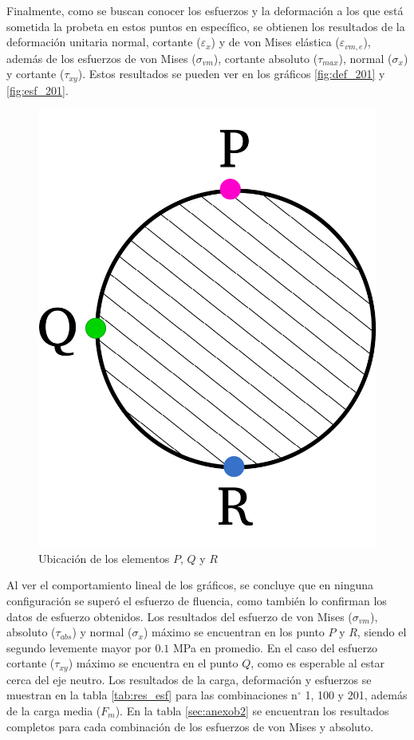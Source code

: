 \newpage

Finalmente, como se buscan conocer los esfuerzos y la deformación a los que está sometida la probeta en estos puntos en específico, se obtienen los resultados de la deformación unitaria normal, cortante ($\varepsilon_x$) y de von Mises elástica ($\varepsilon_{vm,e}$), además de los esfuerzos de von Mises ($\sigma_{vm}$), cortante absoluto ($\tau_{max}$), normal ($\sigma_x$) y cortante ($\tau_{xy}$). Estos resultados se pueden ver en los gráficos \ref{fig:def_201} y \ref{fig:esf_201}.

\begin{figure}[h]
\centering
\includegraphics[width=0.2\linewidth]{Imagenes/diagelem_pqr.pdf}
\caption{Ubicación de los elementos $P$, $Q$ y $R$}
\label{fig:diag_pqr2}
\end{figure}

Al ver el comportamiento lineal de los gráficos, se concluye que en ninguna configuración se superó el esfuerzo de fluencia, como también lo confirman los datos de esfuerzo obtenidos. Los resultados del esfuerzo de von Mises ($\sigma_{vm}$), absoluto ($\tau_{abs}$) y normal ($\sigma_x$) máximo se encuentran en los punto $P$ y $R$, siendo el segundo levemente mayor por $0.1$ MPa en promedio. En el caso del esfuerzo cortante ($\tau_{xy}$) máximo se encuentra en el punto $Q$, como es esperable al estar cerca del eje neutro. Los resultados de la carga, deformación y esfuerzos se muestran en la tabla \ref{tab:res_esf} para las combinaciones n$^{\circ}$ 1, 100 y 201, además de la carga media ($F_m$). En la tabla \ref{sec:anexob2} se encuentran los resultados completos para cada combinación de los esfuerzos de von Mises y absoluto.

